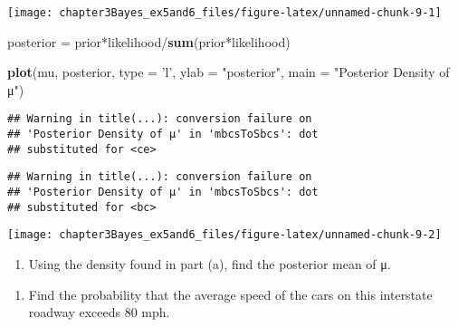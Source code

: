 \documentclass[]{tufte-handout}
\newenvironment{Shaded}{}{}
\newcommand{\KeywordTok}[1]{\textcolor[rgb]{0.00,0.44,0.13}{\textbf{{#1}}}}
\newcommand{\DataTypeTok}[1]{\textcolor[rgb]{0.56,0.13,0.00}{{#1}}}
\newcommand{\StringTok}[1]{\textcolor[rgb]{0.25,0.44,0.63}{{#1}}}
\newcommand{\CommentTok}[1]{\textcolor[rgb]{0.38,0.63,0.69}{\textit{{#1}}}}
\newcommand{\NormalTok}[1]{{#1}}
\begin{document}
\texttt{[image: chapter3Bayes\_ex5and6\_files/figure-latex/unnamed-chunk-9-1]}

\begin{Shaded}
\begin{Highlighting}[]
\NormalTok{posterior =}\StringTok{ }\NormalTok{prior*likelihood/}\KeywordTok{sum}\NormalTok{(prior*likelihood)}

\KeywordTok{plot}\NormalTok{(mu, posterior, }\DataTypeTok{type =} \StringTok{'l'}\NormalTok{, }\DataTypeTok{ylab =} \StringTok{"posterior"}\NormalTok{, }\DataTypeTok{main =} \StringTok{"Posterior Density of μ"}\NormalTok{)}
\end{Highlighting}
\end{Shaded}

\begin{verbatim}
## Warning in title(...): conversion failure on
## 'Posterior Density of μ' in 'mbcsToSbcs': dot
## substituted for <ce>
\end{verbatim}

\begin{verbatim}
## Warning in title(...): conversion failure on
## 'Posterior Density of μ' in 'mbcsToSbcs': dot
## substituted for <bc>
\end{verbatim}

\texttt{[image: chapter3Bayes\_ex5and6\_files/figure-latex/unnamed-chunk-9-2]}

\begin{enumerate}
\def\labelenumi{\alph{enumi})}
\setcounter{enumi}{1}
\itemsep1pt\parskip0pt
\item
  Using the density found in part (a), find the posterior mean of μ.
\end{enumerate}

\begin{Shaded}
\end{Shaded}

\begin{enumerate}
\def\labelenumi{\alph{enumi})}
\setcounter{enumi}{2}
\itemsep1pt\parskip0pt
\item
  Find the probability that the average speed of the cars on this
  interstate roadway exceeds 80 mph.
\end{enumerate}
\end{document}
